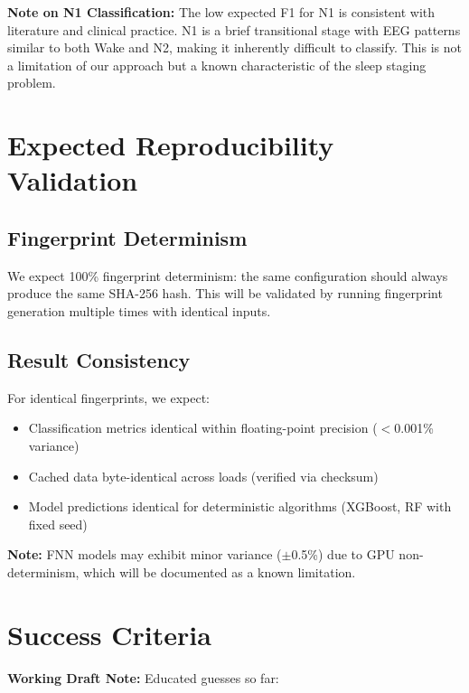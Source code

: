 \textbf{Note on N1 Classification:} The low expected F1 for N1 is consistent with literature and clinical practice. N1 is a brief transitional stage with EEG patterns similar to both Wake and N2, making it inherently difficult to classify. This is not a limitation of our approach but a known characteristic of the sleep staging problem.

\section{Expected Reproducibility Validation}

\subsection{Fingerprint Determinism}

We expect 100\% fingerprint determinism: the same configuration should always produce the same SHA-256 hash. This will be validated by running fingerprint generation multiple times with identical inputs.

\subsection{Result Consistency}

For identical fingerprints, we expect:
\begin{itemize}
\item Classification metrics identical within floating-point precision ($<$0.001\% variance)
\item Cached data byte-identical across loads (verified via checksum)
\item Model predictions identical for deterministic algorithms (XGBoost, RF with fixed seed)
\end{itemize}

\textbf{Note:} FNN models may exhibit minor variance ($\pm$0.5\%) due to GPU non-determinism, which will be documented as a known limitation.

\section{Success Criteria}




\begin{center}
\colorbox{yellow!20}{%
\begin{minipage}{0.9\textwidth}
\textbf{Working Draft Note:} 
Educated guesses so far:
\end{minipage}
}
\end{center}

